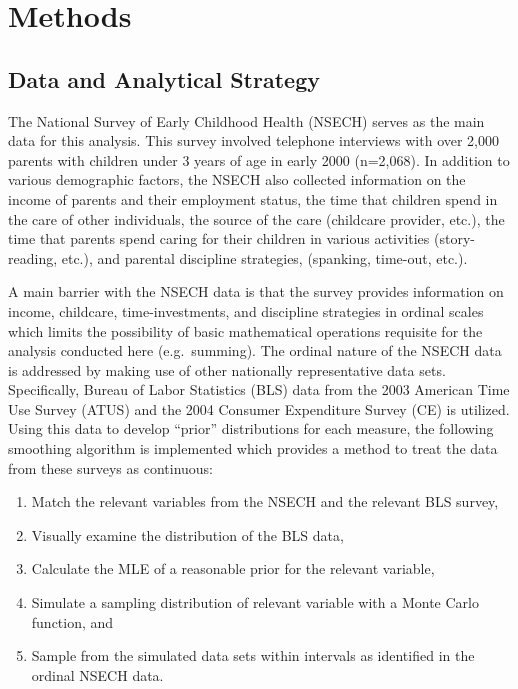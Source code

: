 \documentclass[]{elsarticle}
\begin{document}
\section{Methods}\label{methods}

\subsection{Data and Analytical
Strategy}\label{data-and-analytical-strategy}

The National Survey of Early Childhood Health (NSECH) serves as the main
data for this analysis. This survey involved telephone interviews with
over 2,000 parents with children under 3 years of age in early 2000
(n=2,068). In addition to various demographic factors, the NSECH also
collected information on the income of parents and their employment
status, the time that children spend in the care of other individuals,
the source of the care (childcare provider, etc.), the time that parents
spend caring for their children in various activities (story-reading,
etc.), and parental discipline strategies, (spanking, time-out, etc.).

A main barrier with the NSECH data is that the survey provides
information on income, childcare, time-investments, and discipline
strategies in ordinal scales which limits the possibility of basic
mathematical operations requisite for the analysis conducted here
(e.g.~summing). The ordinal nature of the NSECH data is addressed by
making use of other nationally representative data sets. Specifically,
Bureau of Labor Statistics (BLS) data from the 2003 American Time Use
Survey (ATUS) and the 2004 Consumer Expenditure Survey (CE) is utilized.
Using this data to develop ``prior'' distributions for each measure, the
following smoothing algorithm is implemented which provides a method to
treat the data from these surveys as continuous:

\begin{enumerate}
\def\labelenumi{\arabic{enumi}.}
\itemsep1pt\parskip0pt
\item
  Match the relevant variables from the NSECH and the relevant BLS
  survey,
\item
  Visually examine the distribution of the BLS data,
\item
  Calculate the MLE of a reasonable prior for the relevant variable,
\item
  Simulate a sampling distribution of relevant variable with a Monte
  Carlo function, and
\item
  Sample from the simulated data sets within intervals as identified in
  the ordinal NSECH data.
\end{enumerate}
\end{document}
